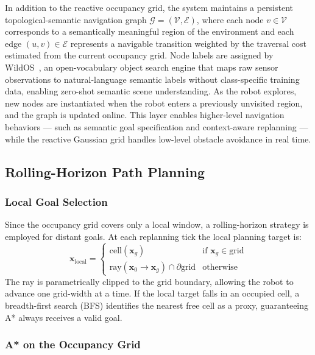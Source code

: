 \documentclass[conference]{IEEEtran}
\begin{document}
In addition to the reactive occupancy grid, the system maintains a persistent topological-semantic navigation graph $\mathcal{G} = (\mathcal{V}, \mathcal{E})$, where each node $v \in \mathcal{V}$ corresponds to a semantically meaningful region of the environment and each edge $(u,v) \in \mathcal{E}$ represents a navigable transition weighted by the traversal cost estimated from the current occupancy grid. Node labels are assigned by WildOS~\cite{shah2026wildosopenvocabularyobjectsearch}, an open-vocabulary object search engine that maps raw sensor observations to natural-language semantic labels without class-specific training data, enabling zero-shot semantic scene understanding. As the robot explores, new nodes are instantiated when the robot enters a previously unvisited region, and the graph is updated online. This layer enables higher-level navigation behaviors — such as semantic goal specification and context-aware replanning — while the reactive Gaussian grid handles low-level obstacle avoidance in real time.

\subsection{Rolling-Horizon Path Planning}

\subsubsection{Local Goal Selection}

Since the occupancy grid covers only a local window, a rolling-horizon strategy is employed for distant goals. At each replanning tick the local planning target is:
\begin{equation}
	\mathbf{x}_{\text{local}} = \begin{cases}
		\text{cell}(\mathbf{x}_g)                                          & \text{if } \mathbf{x}_g \in \text{grid} \\
		\text{ray}(\mathbf{x}_0 \to \mathbf{x}_g) \cap \partial\text{grid} & \text{otherwise}
	\end{cases}
	\label{eq:local-goal}
\end{equation}
The ray is parametrically clipped to the grid boundary, allowing the robot to advance one grid-width at a time. If the local target falls in an occupied cell, a breadth-first search (BFS) identifies the nearest free cell as a proxy, guaranteeing A* always receives a valid goal.

\subsubsection{A* on the Occupancy Grid}
\end{document}
